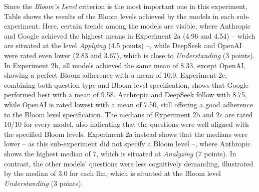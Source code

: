 Since the \textit{Bloom's Level} criterion is the most important one in this experiment, Table  shows the results of the Bloom levels achieved by the models in each sub-experiment. Here, certain trends among the models are visible, where Anthropic and Google achieved the highest means in Experiment 2a (4.96 and 4.54) -- which are situated at the level \textit{Applying} (4.5 points) --, while DeepSeek and OpenAI were rated even lower (2.83 and 3.67), which is close to \textit{Understanding} (3 points). In Experiment 2b, all models achieved the same mean of 8.33, except OpenAI, showing a perfect Bloom adherence with a mean of 10.0. Experiment 2c, combining both question type and Bloom level specification, shows that Google performed best with a mean of 9.58. Anthropic and DeepSeek follow with 8.75, while OpenAI is rated lowest with a mean of 7.50, still offering a good adherence to the Bloom level specification. The medians of Experiment 2b and 2c are rated 10/10 for every model, also indicating that the questions were well aligned with the specified Bloom levels. Experiment 2a instead shows that the medians were lower -- as this sub-experiment did not specify a Bloom level --, where Anthropic shows the highest median of 7, which is situated at \textit{Analyzing} (7 points). In contrast, the other models' questions were less cognitively demanding, illustrated by the median of 3.0 for each \ac{llm}, which is situated at the Bloom level \textit{Understanding} (3 points).

\begin{table}[htbp]
    \centering
    \caption[Student-based Bloom Scores by LLM and Sub-Experiment (Exp2).]{Student-based Bloom Scores by LLM and Sub-Experiment (Exp2).}
    \label{tab:exp2-llm-experiment-bloomslevel}
\end{table}

